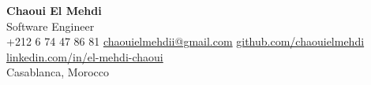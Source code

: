 \documentclass[10pt,a4paper]{article}
\newcommand{\cvname}[1]{{\Huge\bfseries #1}}
\newcommand{\cvtitle}[1]{{\Large\color{cvgray} #1}}
\begin{document}
\begin{center}
    \cvname{Chaoui El Mehdi}\\[2pt]
    \cvtitle{Software Engineer}\\[6pt]
    +212 6 74 47 86 81 \;\textbar\;
    \href{mailto:chaouielmehdii@gmail.com}{chaouielmehdii@gmail.com} \;\textbar\;
    \href{https://github.com/chaouielmehdi}{github.com/chaouielmehdi} \;\textbar\;
    \href{https://linkedin.com/in/el-mehdi-chaoui}{linkedin.com/in/el-mehdi-chaoui}\\[2pt]
    Casablanca, Morocco
\end{center}

\vspace{-4pt}






\end{document}
